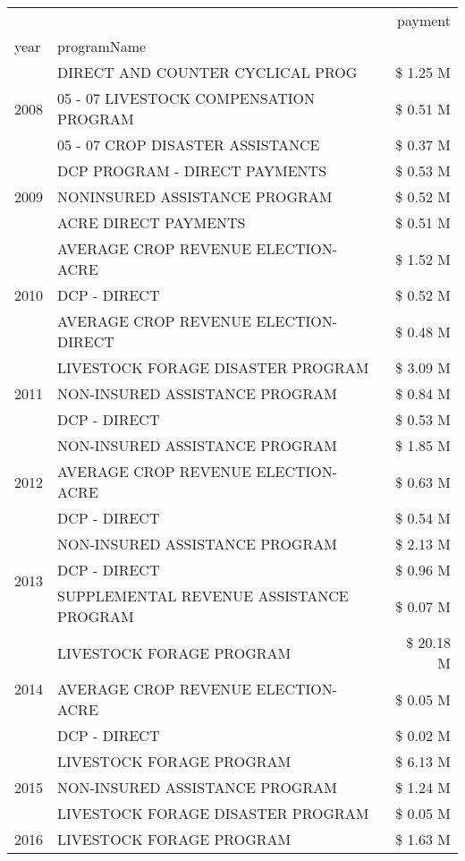 \begin{tabular}{llr}
\toprule
 &  & payment \\
year & programName &  \\
\midrule
\multirow[t]{3}{*}{2008} & DIRECT AND COUNTER CYCLICAL PROG & \$ 1.25 M \\
 & 05 - 07 LIVESTOCK COMPENSATION PROGRAM & \$ 0.51 M \\
 & 05 - 07 CROP DISASTER ASSISTANCE & \$ 0.37 M \\
\cline{1-3}
\multirow[t]{3}{*}{2009} & DCP PROGRAM - DIRECT PAYMENTS & \$ 0.53 M \\
 & NONINSURED ASSISTANCE PROGRAM & \$ 0.52 M \\
 & ACRE DIRECT PAYMENTS & \$ 0.51 M \\
\cline{1-3}
\multirow[t]{3}{*}{2010} & AVERAGE CROP REVENUE ELECTION-ACRE & \$ 1.52 M \\
 & DCP - DIRECT & \$ 0.52 M \\
 & AVERAGE CROP REVENUE ELECTION-DIRECT & \$ 0.48 M \\
\cline{1-3}
\multirow[t]{3}{*}{2011} & LIVESTOCK FORAGE DISASTER PROGRAM & \$ 3.09 M \\
 & NON-INSURED ASSISTANCE PROGRAM & \$ 0.84 M \\
 & DCP - DIRECT & \$ 0.53 M \\
\cline{1-3}
\multirow[t]{3}{*}{2012} & NON-INSURED ASSISTANCE PROGRAM & \$ 1.85 M \\
 & AVERAGE CROP REVENUE ELECTION-ACRE & \$ 0.63 M \\
 & DCP - DIRECT & \$ 0.54 M \\
\cline{1-3}
\multirow[t]{3}{*}{2013} & NON-INSURED ASSISTANCE PROGRAM & \$ 2.13 M \\
 & DCP - DIRECT & \$ 0.96 M \\
 & SUPPLEMENTAL REVENUE ASSISTANCE PROGRAM & \$ 0.07 M \\
\cline{1-3}
\multirow[t]{3}{*}{2014} & LIVESTOCK FORAGE PROGRAM & \$ 20.18 M \\
 & AVERAGE CROP REVENUE ELECTION-ACRE & \$ 0.05 M \\
 & DCP - DIRECT & \$ 0.02 M \\
\cline{1-3}
\multirow[t]{3}{*}{2015} & LIVESTOCK FORAGE PROGRAM & \$ 6.13 M \\
 & NON-INSURED ASSISTANCE PROGRAM & \$ 1.24 M \\
 & LIVESTOCK FORAGE DISASTER PROGRAM & \$ 0.05 M \\
\cline{1-3}
\multirow[t]{3}{*}{2016} & LIVESTOCK FORAGE PROGRAM & \$ 1.63 M \\

\end{tabular}
